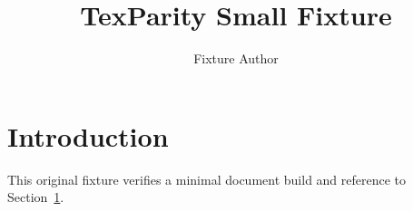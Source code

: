 \documentclass{article}
\title{TexParity Small Fixture}
\author{Fixture Author}
\begin{document}
\maketitle
\section{Introduction}\label{sec:introduction}
This original fixture verifies a minimal document build and reference to Section~\ref{sec:introduction}.
\end{document}
